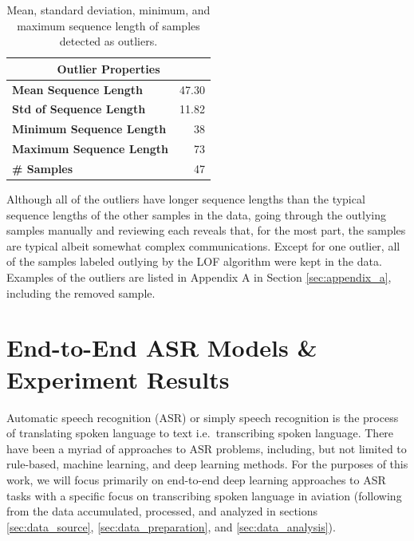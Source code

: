 \documentclass[12pt]{article}
\begin{document}
\begin{table}[!t]
    \centering
    \begin{tabular}{l | r}
        \toprule
        \multicolumn{2}{c}{Outlier Properties}   \\
        \midrule
        \textbf{Mean Sequence Length}    & 47.30 \\
        \textbf{Std of Sequence Length}  & 11.82 \\
        \textbf{Minimum Sequence Length} & 38    \\
        \textbf{Maximum Sequence Length} & 73    \\
        \textbf{\# Samples}              & 47    \\
        \bottomrule
    \end{tabular}
    \caption{Mean, standard deviation, minimum, and maximum sequence length of samples detected as outliers.}
    \label{tab:outlier_stats}
\end{table}

Although all of the outliers have longer sequence lengths than the typical sequence lengths of the other samples in the data, going through the
outlying samples manually and reviewing each reveals that, for the most part, the samples are typical albeit somewhat complex communications. Except
for one outlier, all of the samples labeled outlying by the LOF algorithm were kept in the data. Examples of the outliers are listed in Appendix A in
Section \ref{sec:appendix_a}, including the removed sample.

\section{End-to-End ASR Models \& Experiment Results}
Automatic speech recognition (ASR) or simply speech recognition is the process of translating spoken language to text i.e.~transcribing spoken
language. There have been a myriad of approaches to ASR problems, including, but not limited to rule-based, machine learning, and deep learning
methods. For the purposes of this work, we will focus primarily on end-to-end deep learning approaches to ASR tasks with a specific focus on
transcribing spoken language in aviation (following from the data accumulated, processed, and analyzed in sections \ref{sec:data_source},
\ref{sec:data_preparation}, and \ref{sec:data_analysis}).
\end{document}
